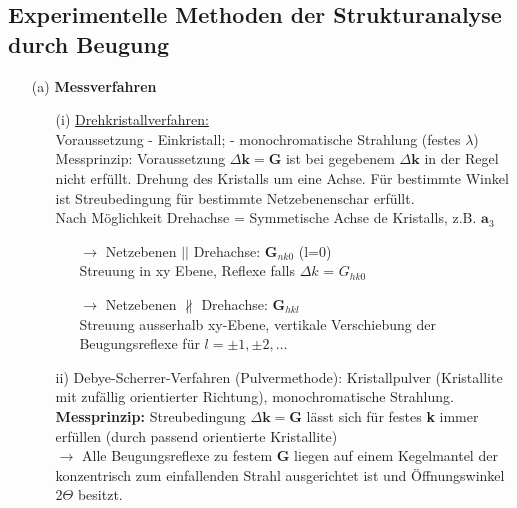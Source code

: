 \subsection{Experimentelle Methoden der Strukturanalyse durch Beugung} \label{kap:4_4}
\begin{itemize}
    \item[(a)] \textbf{Messverfahren}
    \begin{itemize}
        \item[(i)] \underline{Drehkristallverfahren:}\\
        Voraussetzung - Einkristall; - monochromatische Strahlung (festes $\lambda$)\\
        Messprinzip: Voraussetzung $\Delta \textbf{k} = \textbf{G}$ ist bei gegebenem $\Delta \textbf{k}$ in der Regel nicht erfüllt. Drehung des Kristalls um eine Achse. Für bestimmte Winkel ist Streubedingung für bestimmte Netzebenenschar erfüllt.\\
        Nach Möglichkeit Drehachse = Symmetische Achse de Kristalls, z.B. $\textbf{a}_3$
        \begin{itemize}
            \item[$\rightarrow$] Netzebenen $||$ Drehachse: \textbf{G}$_{nk0}$ (l=0)\\
            Streuung in xy Ebene, Reflexe falls $\Delta k$ = $G_{hk0}$
            \item[$\rightarrow$] Netzebenen $\nparallel$ Drehachse: $\textbf{G}_{hkl}$\\
            Streuung ausserhalb xy-Ebene, vertikale Verschiebung der Beugungsreflexe für $l = \pm 1, \pm 2, \dots$
	   \end{itemize}
	   \item[ii)] Debye-Scherrer-Verfahren (Pulvermethode):
		Kristallpulver (Kristallite mit zufällig orientierter Richtung), monochromatische Strahlung.\\
		\textbf{Messprinzip:}  Streubedingung $\Delta \textbf{k} = \textbf{G}$ lässt sich für festes \textbf{k} immer erfüllen (durch passend orientierte Kristallite)\\
		$\rightarrow$ Alle Beugungsreflexe zu festem \textbf{G} liegen auf einem Kegelmantel der konzentrisch zum einfallenden Strahl ausgerichtet ist und Öffnungswinkel $2\Theta$ besitzt.

\end{itemize}
\end{itemize}

